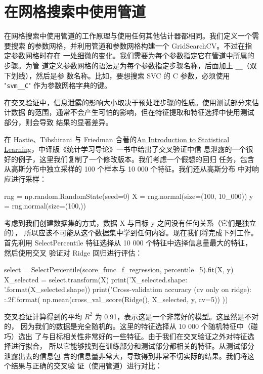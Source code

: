 \section{在网格搜索中使用管道}
在网格搜索中使用管道的工作原理与使用任何其他估计器都相同。我们定义一个需要搜索
的参数网格，并利用管道和参数网格构建一个 GridSearchCV。不过在指定参数网格时存在
一处细微的变化。我们需要为每个参数指定它在管道中所属的步骤。为管
道定义参数网格的语法是为每个参数指定步骤名称，后面加上 \verb|__|（双下划线），然后是参
数名称。比如，要想搜索 SVC 的 C 参数，必须使用 "\verb|svm__C|" 作为参数网格字典的键。

在交叉验证中，信息泄露的影响大小取决于预处理步骤的性质。使用测试部分来估计数据
的范围，通常不会产生可怕的影响，但在特征提取和特征选择中使用测试部分，则会导致
结果的显著差异。

\begin{tcolorbox}[title=举例说明信息泄露]
    在 Hastie、Tibshirani 与 Friedman 合著的\href{https://www.statlearning.com/}{An Introduction to Statistical Learning}，中译版《统计学习导论》一书中给出了交叉验证中信
    息泄露的一个很好的例子，这里我们复制了一个修改版本。我们考虑一个假想的回归
    任务，包含从高斯分布中独立采样的 100 个样本与 10 000 个特征。我们还从高斯分布
    中对响应进行采样：

    \begin{pyc}
        rng = np.random.RandomState(seed=0)
        X = rng.normal(size=(100, 10_000))
        y = rng.normal(size=(100,))
    \end{pyc}

    考虑到我们创建数据集的方式，数据 X 与目标 y 之间没有任何关系（它们是独立的），
    所以应该不可能从这个数据集中学到任何内容。现在我们将完成下列工作。首先利用
    SelectPercentile 特征选择从 10 000 个特征中选择信息量最大的特征，然后使用交叉
    验证对 Ridge 回归进行评估：
    \begin{pyc}
        select = SelectPercentile(score_func=f_regression, percentile=5).fit(X, y)
        X_selected = select.transform(X)
        print('X_selected.shape: {}'.format(X_selected.shape))
        print('Cross-validation accuracy (cv only on ridge): {:.2f}'.format(
        np.mean(cross_val_score(Ridge(), X_selected, y, cv=5))
        ))
    \end{pyc}
    交叉验证计算得到的平均 $R^2$ 为 0.91，表示这是一个非常好的模型。这显然是不对的，
    因为我们的数据是完全随机的。这里的特征选择从 10 000 个随机特征中（碰巧）选出
    了与目标相关性非常好的一些特征。由于我们在交叉验证之外对特征选择进行拟合，
    所以它能够找到在训练部分和测试部分都相关的特征。从测试部分泄露出去的信息包
    含的信息量非常大，导致得到非常不切实际的结果。我们将这个结果与正确的交叉验
    证（使用管道）进行对比：



\end{tcolorbox}
